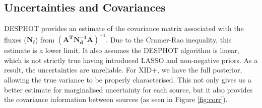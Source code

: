 \documentclass[useAMS,usenatbib]{mnras}
\begin{document}
\subsection{Uncertainties and Covariances}
\textsc{DESPHOT} provides an estimate of the covariance matrix associated with the fluxes ($\mathbf{N_f}$) from $(\mathbf{A^TN_d^{-1}A})^{-1}$. Due to the Cramer-Rao inequality, this estimate is a lower limit. It also assumes the \textsc{DESPHOT} algorithm is linear, which is not strictly true having introduced LASSO and non-negative priors. As a result, the uncertainties are unreliable. For \textsc{XID+}, we have the full posterior, allowing the true variance to be properly characterised. This not only gives us a better estimate for marginalised uncertainty for each source, but it also provides the covariance information between sources (as seen in Figure \ref{fig:corr}). 
%

\end{document}
